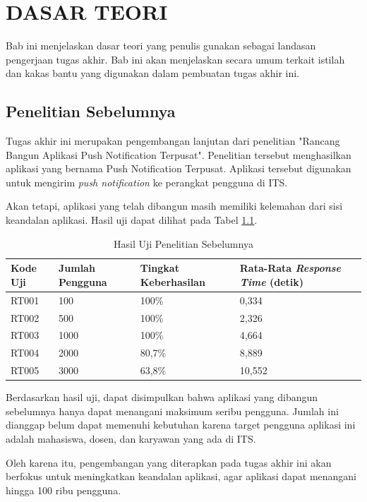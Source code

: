 \chapter{DASAR TEORI}
\par Bab ini menjelaskan dasar teori yang penulis gunakan sebagai landasan pengerjaan tugas akhir. Bab ini akan menjelaskan secara umum terkait istilah dan kakas bantu yang digunakan dalam pembuatan tugas akhir ini.

\section{Penelitian Sebelumnya}
\par Tugas akhir ini merupakan pengembangan lanjutan dari penelitian "Rancang Bangun Aplikasi Push Notification Terpusat". Penelitian tersebut menghasilkan aplikasi yang bernama Push Notification Terpusat. Aplikasi tersebut digunakan untuk mengirim \textit{push notification} ke perangkat pengguna di ITS.
\par Akan tetapi, aplikasi yang telah dibangun masih memiliki kelemahan dari sisi keandalan aplikasi. Hasil uji dapat dilihat pada Tabel \ref{t:hasil_uji_sebelum}.
\begin{longtable}{|p{1.5cm}|p{2cm}|p{2cm}|p{2.5cm}|}
	\caption{Hasil Uji Penelitian Sebelumnya \cite{application-thesis}} \label{t:hasil_uji_sebelum} \\ \hline
	\rowcolor{lightgray} Kode Uji & Jumlah Pengguna & Tingkat Keberhasilan & Rata-Rata \textit{Response Time} (detik) \\ \hline
	RT001 & 100 & 100\% & 0,334 \\ \hline
	RT002 & 500 & 100\% & 2,326 \\ \hline
	RT003 & 1000 & 100\% & 4,664 \\ \hline
	RT004 & 2000 & 80,7\% & 8,889 \\ \hline
	RT005 & 3000 & 63,8\% & 10,552 \\ \hline
\end{longtable}
\par Berdasarkan hasil uji, dapat disimpulkan bahwa aplikasi yang dibangun sebelumnya hanya dapat menangani maksimum seribu pengguna. Jumlah ini dianggap belum dapat memenuhi kebutuhan karena target pengguna aplikasi ini adalah mahasiswa, dosen, dan karyawan yang ada di ITS.
\par Oleh karena itu, pengembangan yang diterapkan pada tugas akhir ini akan berfokus untuk meningkatkan keandalan aplikasi, agar aplikasi dapat menangani hingga 100 ribu pengguna.

